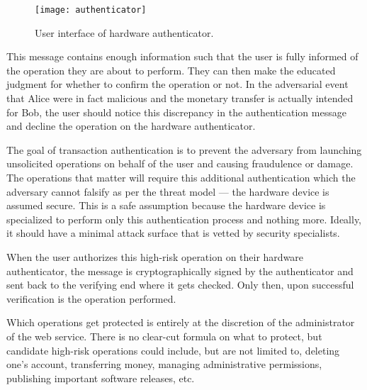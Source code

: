\begin{figure}[h]
  \centering
  \texttt{[image: authenticator]}
  \caption{User interface of hardware authenticator.}
\end{figure}

This message contains enough information such that the user is fully informed of the operation they are about to perform. They can then make the educated judgment for whether to confirm the operation or not. In the adversarial event that Alice were in fact malicious and the monetary transfer is actually intended for Bob, the user should notice this discrepancy in the authentication message and decline the operation on the hardware authenticator. 

The goal of transaction authentication is to prevent the adversary from launching unsolicited operations on behalf of the user and causing fraudulence or damage. The operations that matter will require this additional authentication which the adversary cannot falsify as per the threat model --- the hardware device is assumed secure. This is a safe assumption because the hardware device is specialized to perform only this authentication process and nothing more. Ideally, it should have a minimal attack surface that is vetted by security specialists. 

When the user authorizes this high-risk operation on their hardware authenticator, the message is cryptographically signed by the authenticator and sent back to the verifying end where it gets checked. Only then, upon successful verification is the operation performed. 

Which operations get protected is entirely at the discretion of the administrator of the web service. There is no clear-cut formula on what to protect, but candidate high-risk operations could include, but are not limited to, deleting one's account, transferring money, managing administrative permissions, publishing important software releases, etc. 




